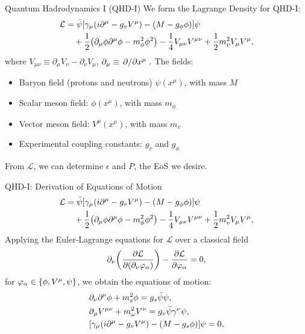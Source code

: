 \documentclass[]{beamer}
\newcommand{\Letter}[1]{\mathcal{#1}}
\newcommand{\Lag}{\Letter{L}}
\newcommand{\Def}{\equiv}
\newcommand{\p}{\partial}
\begin{document}
    \begin{frame}{Quantum Hadrodynamics I (QHD-I)}
        We form the Lagrange Density for QHD-I: \pause
        \begin{align*}
            \Lag & = \bar{\psi} \bqty{\gamma_\mu(i\p^\mu -g_v V^\mu) - (M-g_\phi\phi)} \psi \nonumber\\
            & \quad + \frac{1}{2} \pqty{\p_\mu \phi \p^\mu \phi - m_\phi^2 \phi^2} - \frac{1}{4} V_{\mu\nu}V^{\mu\nu} + \frac{1}{2} m_v^2 V_\mu V^\mu,
        \end{align*}
        where $V_{\mu\nu}\Def\p_\mu V_\nu - \p_\nu V_\mu$, $\p_\mu \Def \pdv*{x^\mu}.$ The fields:
        \begin{itemize}
            \item Baryon field (protons and neutrons) $\psi(x^\mu)$, with mass $M$ 
            \item Scalar meson field: $\phi(x^\mu)$, with mass $m_\phi$ 
            \item Vector meson field: $V^\mu(x^\mu)$, with mass $m_v$
            \item Experimental coupling constants: $g_v$ and $g_\phi$ \pause
        \end{itemize}
        From $\Lag$, we can determine $\epsilon$ and $P$, the EoS we desire.
    \end{frame}

    \begin{frame}{QHD-I: Derivation of Equations of Motion}
        \begin{align*}
            \Lag & = \bar{\psi} \bqty{\gamma_\mu(i\p^\mu -g_v V^\mu) - (M-g_\phi\phi)} \psi \nonumber\\
            & \quad + \frac{1}{2} \pqty{\p_\mu \phi \p^\mu \phi - m_\phi^2 \phi^2} - \frac{1}{4} V_{\mu\nu}V^{\mu\nu} + \frac{1}{2} m_v^2 V_\mu V^\mu,
        \end{align*}\pause
        Applying the Euler-Lagrange equations for $\Lag$ over a classical field
        \[\p_\nu\qty(\pdv{\Lag}{(\p_\nu \varphi_\alpha)}) - \pdv{\Lag}{\varphi_\alpha} = 0,\]
        for $\varphi_\alpha \in \Bqty{\phi, V^\mu, \psi}$, \pause we obtain the equations of motion:
        \begin{align*}
            &\p_\nu \p^\nu \phi + m_s^2\phi = g_s\bar{\psi}\psi,\\
            &\p_\mu V^{\mu\nu} + m_\omega^2 V^\nu = g_v \bar\psi \gamma^\nu \psi,\\
            &\bqty{\gamma_\mu(i\p^\mu -g_v V^\mu) - (M-g_s\phi)} \psi = 0,\\
        \end{align*}
    \end{frame}
\end{document}
